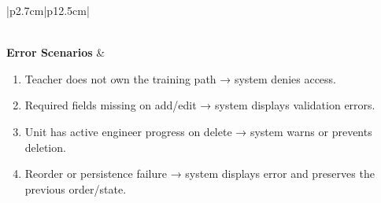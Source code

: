 \begin{table}[H]
\begin{tabular}{|p{2.7cm}|p{12.5cm}|}
\begin{minipage}[t]{\linewidth}
\begin{enumerate}[topsep=0pt,itemsep=1pt,parsep=0pt,partopsep=0pt]
            \end{enumerate}
        \end{minipage} \\
        \hline
        \textbf{Error Scenarios} &
        \begin{minipage}[t]{\linewidth}
            \begin{enumerate}[topsep=0pt,itemsep=1pt,parsep=0pt,partopsep=0pt]
                \item Teacher does not own the training path → system denies access.
                \item Required fields missing on add/edit → system displays validation errors.
                \item Unit has active engineer progress on delete → system warns or prevents deletion.
                \item Reorder or persistence failure → system displays error and preserves the previous order/state.
            \end{enumerate}
        \end{minipage} \\
        \hline
    \end{tabular}
    \label{tab:teacher-manage-units}
\end{table}
 
